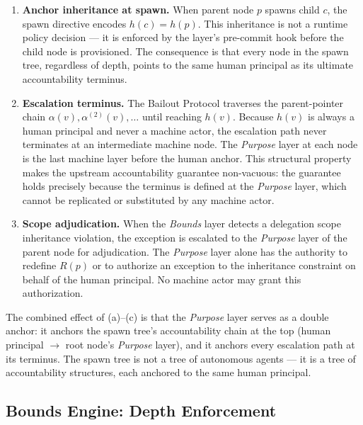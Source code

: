 \begin{enumerate}
\item[(a)] \textbf{Anchor inheritance at spawn.} When parent node $p$ spawns
child $c$, the spawn directive encodes $h(c) = h(p)$. This inheritance is not
a runtime policy decision — it is enforced by the \fact{} layer's pre-commit
hook before the child node is provisioned. The consequence is that every node
in the spawn tree, regardless of depth, points to the same human principal as
its ultimate accountability terminus.

\item[(b)] \textbf{Escalation terminus.} The Bailout Protocol traverses the
parent-pointer chain $\alpha(v), \alpha^{(2)}(v), \ldots$ until reaching
$h(v)$. Because $h(v)$ is always a human principal and never a machine actor,
the escalation path never terminates at an intermediate machine node. The
\textit{Purpose} layer at each node is the last machine layer before the human
anchor. This structural property makes the upstream accountability guarantee
non-vacuous: the guarantee holds precisely because the terminus is defined at
the \textit{Purpose} layer, which cannot be replicated or substituted by any
machine actor.

\item[(c)] \textbf{Scope adjudication.} When the \textit{Bounds} layer detects
a delegation scope inheritance violation, the exception is escalated to the
\textit{Purpose} layer of the parent node for adjudication. The
\textit{Purpose} layer alone has the authority to redefine $R(p)$ or to
authorize an exception to the inheritance constraint on behalf of the human
principal. No machine actor may grant this authorization.
\end{enumerate}

The combined effect of (a)–(c) is that the \textit{Purpose} layer serves as
a double anchor: it anchors the spawn tree's accountability chain at the top
(human principal $\rightarrow$ root node's \textit{Purpose} layer), and it
anchors every escalation path at its terminus. The spawn tree is not a tree of
autonomous agents — it is a tree of accountability structures, each anchored to
the same human principal.

\subsection{Bounds Engine: Depth Enforcement}
\label{sec:bounds-depth}

